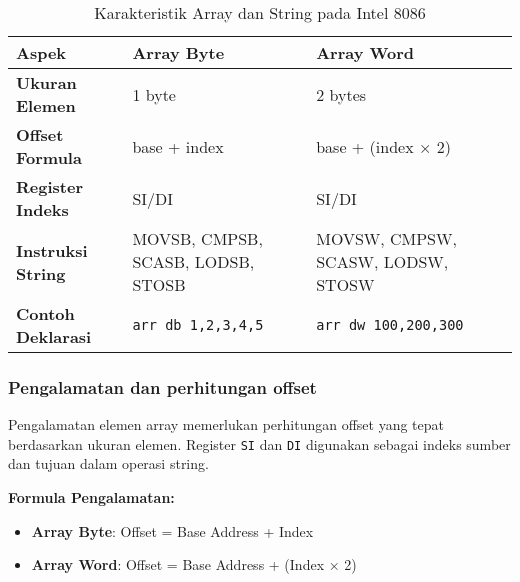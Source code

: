 \documentclass[../main.tex]{subfiles}
\begin{document}
            \begin{table}[H]
                \centering
                \caption{Karakteristik Array dan String pada Intel 8086}
                \begin{tabular}{|p{3cm}|p{4cm}|p{6cm}|}
                    \hline
                    \textbf{Aspek} & \textbf{Array Byte} & \textbf{Array Word} \\
                    \hline
                    \textbf{Ukuran Elemen} & 1 byte & 2 bytes \\
                    \hline
                    \textbf{Offset Formula} & base + index & base + (index × 2) \\
                    \hline
                    \textbf{Register Indeks} & SI/DI & SI/DI \\
                    \hline
                    \textbf{Instruksi String} & MOVSB, CMPSB, SCASB, LODSB, STOSB & MOVSW, CMPSW, SCASW, LODSW, STOSW \\
                    \hline
                    \textbf{Contoh Deklarasi} & \texttt{arr db 1,2,3,4,5} & \texttt{arr dw 100,200,300} \\
                    \hline
                \end{tabular}
                \label{tab:array-characteristics}
            \end{table}

        \subsubsection{Pengalamatan dan perhitungan offset}
            Pengalamatan elemen array memerlukan perhitungan offset yang tepat berdasarkan ukuran elemen. Register \texttt{SI} dan \texttt{DI} digunakan sebagai indeks sumber dan tujuan dalam operasi string.

            \textbf{Formula Pengalamatan:}
            \begin{itemize}
                \item \textbf{Array Byte}: Offset = Base Address + Index
                \item \textbf{Array Word}: Offset = Base Address + (Index × 2)
            \end{itemize}
\end{document}
